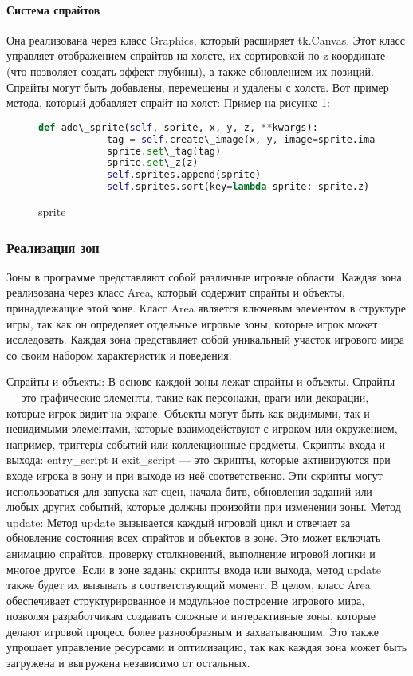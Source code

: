 \paragraph{Система спрайтов}
Она реализована через класс Graphics, который расширяет tk.Canvas. Этот класс управляет отображением спрайтов на холсте, их сортировкой по z-координате (что позволяет создать эффект глубины), а также обновлением их позиций. Спрайты могут быть добавлены, перемещены и удалены с холста. Вот пример метода, который добавляет спрайт на холст:
Пример на рисунке \ref{ttk:image}:
\begin{figure}[H]
	\begin{lstlisting}[language=Python]
		def add\_sprite(self, sprite, x, y, z, **kwargs):
			tag = self.create\_image(x, y, image=sprite.image, anchor='center', **kwargs)
			sprite.set\_tag(tag)
			sprite.set\_z(z)
			self.sprites.append(sprite)
			self.sprites.sort(key=lambda sprite: sprite.z)
\end{lstlisting}  
\caption{sprite}
\label{ttk:image}
\end{figure}
\subsubsection{Реализация зон}
Зоны в программе представляют собой различные игровые области. Каждая зона реализована через класс Area, который содержит спрайты и объекты, принадлежащие этой зоне. Класс Area является ключевым элементом в структуре игры, так как он определяет отдельные игровые зоны, которые игрок может исследовать. Каждая зона представляет собой уникальный участок игрового мира со своим набором характеристик и поведения.

Спрайты и объекты: В основе каждой зоны лежат спрайты и объекты. Спрайты — это графические элементы, такие как персонажи, враги или декорации, которые игрок видит на экране. Объекты могут быть как видимыми, так и невидимыми элементами, которые взаимодействуют с игроком или окружением, например, триггеры событий или коллекционные предметы.
Скрипты входа и выхода: entry\_script и exit\_script — это скрипты, которые активируются при входе игрока в зону и при выходе из неё соответственно. Эти скрипты могут использоваться для запуска кат-сцен, начала битв, обновления заданий или любых других событий, которые должны произойти при изменении зоны.
Метод update: Метод update вызывается каждый игровой цикл и отвечает за обновление состояния всех спрайтов и объектов в зоне. Это может включать анимацию спрайтов, проверку столкновений, выполнение игровой логики и многое другое. Если в зоне заданы скрипты входа или выхода, метод update также будет их вызывать в соответствующий момент.
В целом, класс Area обеспечивает структурированное и модульное построение игрового мира, позволяя разработчикам создавать сложные и интерактивные зоны, которые делают игровой процесс более разнообразным и захватывающим. Это также упрощает управление ресурсами и оптимизацию, так как каждая зона может быть загружена и выгружена независимо от остальных.
